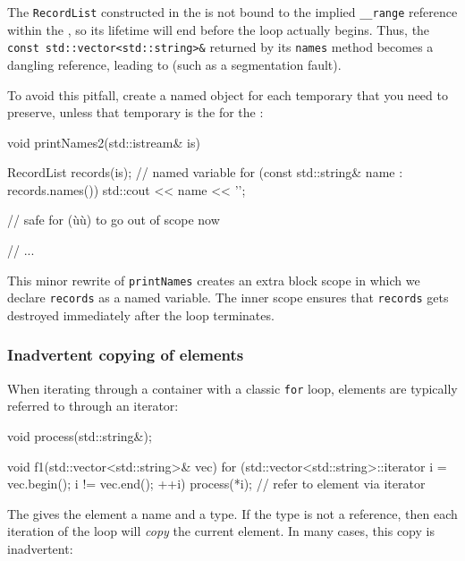 {{{\noindent The \lstinline!RecordList! constructed in the  is
not bound to the implied \lstinline!__range! reference within the
, so its lifetime will end before
the loop actually begins. Thus, the
\lstinline!const!~\lstinline!std::vector<std::string>&! returned by its
\lstinline!names! method becomes a dangling reference, leading to
 (such as a segmentation fault).

To avoid this pitfall, create a named object for each temporary that you
need to preserve, unless that temporary is the 
for the :

\begin{emcppslisting}
void printNames2(std::istream& is)
{
    {
        RecordList records(is);  // named variable
        for (const std::string& name : records.names())
        {
            std::cout << name << '\n';
        }

        // safe for (ù{}ù) to go out of scope now
    }

    // ...
}
\end{emcppslisting}
    

\noindent This minor rewrite of \lstinline!printNames! creates an extra block scope
in which we declare \lstinline!records! as a named variable. The inner
scope ensures that \lstinline!records! gets destroyed immediately after the
loop terminates.

\subsubsection[Inadvertent copying of elements]{Inadvertent copying of elements}\label{inadvertent-copying-of-elements}

When iterating through a container with a classic \lstinline!for! loop,
elements are typically referred to through an iterator:

\begin{emcppslisting}
void process(std::string&);

void f1(std::vector<std::string>& vec)
{
    for (std::vector<std::string>::iterator i = vec.begin();
         i != vec.end(); ++i)
    {
        process(*i);  // refer to element via iterator
    }
}
\end{emcppslisting}
    

\noindent The  gives the element a name and
a type. If the type is not a reference, then each iteration of the loop
will \emph{copy} the current element. In many cases, this copy is
inadvertent:

}}}
